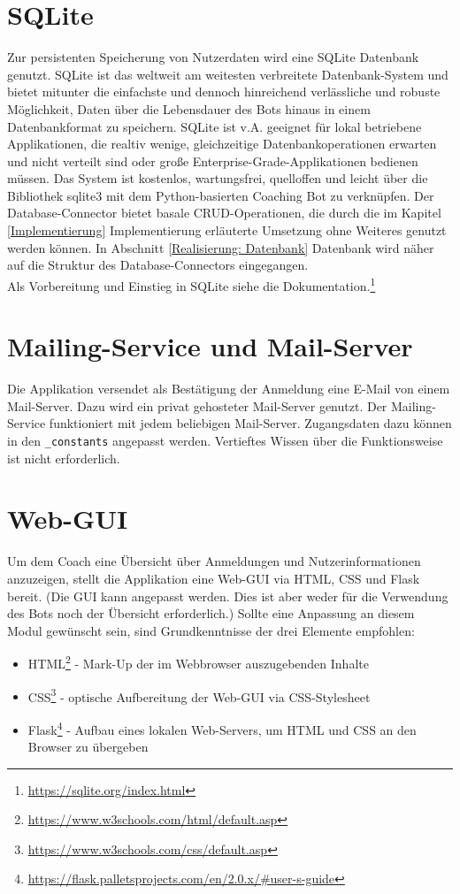     \section{SQLite}
        Zur persistenten Speicherung von Nutzerdaten wird eine SQLite Datenbank \cite{sqlite} genutzt. SQLite ist das weltweit am weitesten verbreitete Datenbank-System und bietet mitunter die einfachste und dennoch hinreichend verlässliche und robuste Möglichkeit, Daten über die Lebensdauer des Bots hinaus in einem Datenbankformat zu speichern. SQLite ist v.A. geeignet für lokal betriebene Applikationen, die realtiv wenige, gleichzeitige Datenbankoperationen erwarten und nicht verteilt sind oder große Enterprise-Grade-Applikationen bedienen müssen. Das System ist kostenlos, wartungsfrei, quelloffen und leicht über die Bibliothek sqlite3 \cite{sqlite3API} mit dem Python-basierten Coaching Bot zu verknüpfen. Der Database-Connector bietet basale CRUD-Operationen, die durch die im Kapitel \ref{Implementierung} Implementierung erläuterte Umsetzung ohne Weiteres genutzt werden können. In Abschnitt \ref{Realisierung: Datenbank} Datenbank wird näher auf die Struktur des Database-Connectors eingegangen. \\
        Als Vorbereitung und Einstieg in SQLite siehe die Dokumentation.\footnote{\url{https://sqlite.org/index.html}}


    \section{Mailing-Service und Mail-Server}
        Die Applikation versendet als Bestätigung der Anmeldung eine E-Mail von einem Mail-Server. Dazu wird ein privat gehosteter Mail-Server genutzt. Der Mailing-Service funktioniert mit jedem beliebigen Mail-Server. Zugangsdaten dazu können in den \verb|_constants| angepasst werden. Vertieftes Wissen über die Funktionsweise ist nicht erforderlich.


    \section{Web-GUI}
        Um dem Coach eine Übersicht über Anmeldungen und Nutzerinformationen anzuzeigen, stellt die Applikation eine Web-GUI via HTML, CSS und Flask bereit. (Die GUI kann angepasst werden. Dies ist aber weder für die Verwendung des Bots noch der Übersicht erforderlich.) Sollte eine Anpassung an diesem Modul gewünscht sein, sind Grundkenntnisse der drei Elemente empfohlen: 
        \begin{itemize}
            \item HTML\footnote{\url{https://www.w3schools.com/html/default.asp}} - Mark-Up der im Webbrowser auszugebenden Inhalte
            \item CSS\footnote{\url{https://www.w3schools.com/css/default.asp}} - optische Aufbereitung der Web-GUI via CSS-Stylesheet
            \item Flask\footnote{\url{https://flask.palletsprojects.com/en/2.0.x/\#user-s-guide}} - Aufbau eines lokalen Web-Servers, um HTML und CSS an den Browser zu übergeben
        \end{itemize}

